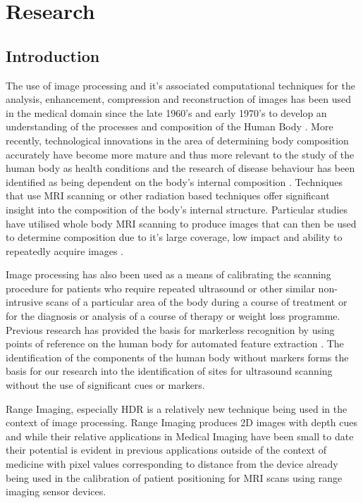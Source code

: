 \chapter{Research}

\label{research}

\section{Introduction}

The use of image processing and it's associated computational techniques for the analysis, enhancement, compression and reconstruction of images has been used in the medical domain since the late 1960's and early 1970's to develop an understanding of the processes and composition of the Human Body \cite{HansonHistory}. 
More recently, technological innovations in the area of determining body composition accurately have become more mature \cite{WeyersBodpod} and thus more relevant to the study of the human body as health conditions and the research of disease behaviour has been identified as being dependent on the body's internal composition \cite{SteinkampComposition}. 
Techniques that use MRI scanning or other radiation based techniques offer significant insight into the composition of the body's internal structure. 
Particular studies have utilised whole body MRI scanning to produce images that can then be used to determine composition due to it's large coverage, low impact and ability to repeatedly acquire images \cite{KullbergMRI}. 

Image processing has also been used as a means of calibrating the scanning procedure for patients who require repeated ultrasound or other similar non-intrusive scans of a particular area of the body during a course of treatment or for the diagnosis or analysis of a course of therapy or weight loss programme. 
Previous research has provided the basis for markerless recognition by using points of reference on the human body for automated feature extraction \cite{LeongMarkerless}. 
The identification of the components of the human body without markers forms the basis for our research into the identification of sites for ultrasound scanning without the use of significant cues or markers.

Range Imaging, especially HDR is a relatively new technique being used in the context of image processing. 
Range Imaging produces 2D images with depth cues and while their relative applications in Medical Imaging have been small to date their potential is evident in previous applications outside of the context of medicine with pixel values corresponding to distance from the device already being used in the calibration of patient positioning for MRI scans using range imaging sensor devices.

